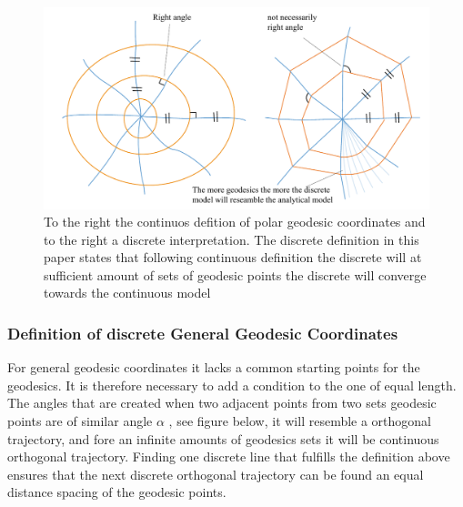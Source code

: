 \begin{figure}[H]
\centering
\includegraphics[width = 1.0\linewidth ]{figure/Method/polargeo.pdf}
\caption{To the right the continuos defition of polar geodesic coordinates and to the right a discrete interpretation. The discrete definition in this paper states that following continuous definition the discrete will at sufficient amount of sets of geodesic points the discrete will converge towards the continuous model}

\end{figure}

\subsubsection{Definition of discrete General Geodesic Coordinates}

For general geodesic coordinates it lacks a common starting points for the geodesics. It is therefore necessary to add a condition to the one of equal length. The angles that are created when two adjacent points from two sets geodesic points are of similar angle $\alpha$ , see figure below, it will resemble a orthogonal trajectory, and fore an infinite amounts of geodesics sets it will be continuous orthogonal trajectory. Finding one discrete line that fulfills the definition above ensures that the next discrete orthogonal trajectory can be found an equal distance spacing of the geodesic points.

